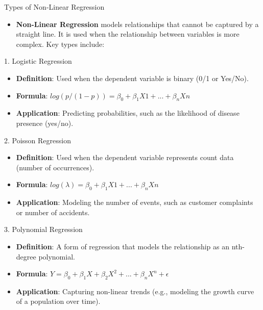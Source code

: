 \documentclass[
  18 pt,
  ignorenonframetext,
  aspectratio=1610,
]{beamer}
\providecommand{\tightlist}{%
  \setlength{\itemsep}{0pt}\setlength{\parskip}{0pt}}\usepackage{longtable,booktabs,array}
\begin{document}
\begin{frame}{Types of Non-Linear Regression}
\protect\hypertarget{types-of-non-linear-regression}{}
\scriptsize

\begin{itemize}
\tightlist
\item
  \textbf{Non-Linear Regression} models relationships that cannot be
  captured by a straight line. It is used when the relationship between
  variables is more complex. Key types include:
\end{itemize}

\begin{block}{1. Logistic Regression}
\protect\hypertarget{logistic-regression}{}
\begin{itemize}
\tightlist
\item
  \textbf{Definition}: Used when the dependent variable is binary (0/1
  or Yes/No).
\item
  \textbf{Formula}:
  \(log(p / (1-p)) = \beta_0 + \beta_1X1 + ... + \beta_nXn\)
\item
  \textbf{Application}: Predicting probabilities, such as the likelihood
  of disease presence (yes/no).
\end{itemize}
\end{block}

\begin{block}{2. Poisson Regression}
\protect\hypertarget{poisson-regression}{}
\begin{itemize}
\tightlist
\item
  \textbf{Definition}: Used when the dependent variable represents count
  data (number of occurrences).
\item
  \textbf{Formula}: \(log(λ) = \beta_0 + \beta_1X1 + ... + \beta_nXn\)
\item
  \textbf{Application}: Modeling the number of events, such as customer
  complaints or number of accidents.
\end{itemize}
\end{block}

\begin{block}{3. Polynomial Regression}
\protect\hypertarget{polynomial-regression}{}
\begin{itemize}
\tightlist
\item
  \textbf{Definition}: A form of regression that models the relationship
  as an nth-degree polynomial.
\item
  \textbf{Formula}:
  \(Y = \beta_0 + \beta_1X + \beta_2X^2 + ... + \beta_nX^n + \epsilon\)
\item
  \textbf{Application}: Capturing non-linear trends (e.g., modeling the
  growth curve of a population over time).
\end{itemize}

\normalsize
\end{block}
\end{frame}
\end{document}
